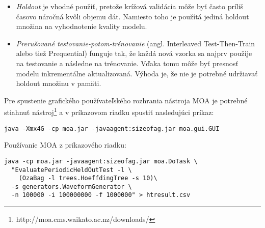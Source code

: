 \begin{itemize}
	\item \textit{Holdout} je vhodné použiť, pretože krížová validácia môže byť často príliš časovo náročná kvôli objemu dát. Namiesto toho je použítá jediná holdout množina na vyhodnotenie kvality modelu.
	\item \textit{Prerušované testovanie-potom-trénovanie} (angl. Interleaved Test-Then-Train alebo tiež Prequential) funguje tak, že každá nová vzorka sa najprv použije na testovanie a následne na trénovanie. Vďaka tomu môže byť presnosť modelu inkrementálne aktualizovaná. Výhoda je, že nie je potrebné udržiavať holdout množinu v pamäti. 
\end{itemize}
\par
Pre spustenie grafického používateľského rozhrania nástroja MOA je potrebné stiahnuť nástroj\footnote{http://moa.cms.waikato.ac.nz/downloads/} a v príkazovom riadku spustiť nasledujúci príkaz:
\begin{lstlisting}
java -Xmx4G -cp moa.jar -javaagent:sizeofag.jar moa.gui.GUI
\end{lstlisting}
Používanie MOA z príkazového riadku:
\begin{lstlisting}
java -cp moa.jar -javaagent:sizeofag.jar moa.DoTask \
  "EvaluatePeriodicHeldOutTest -l \
	(OzaBag -l trees.HoeffdingTree -s 10)\
  -s generators.WaveformGenerator \
  -n 100000 -i 100000000 -f 1000000" > htresult.csv
\end{lstlisting}


